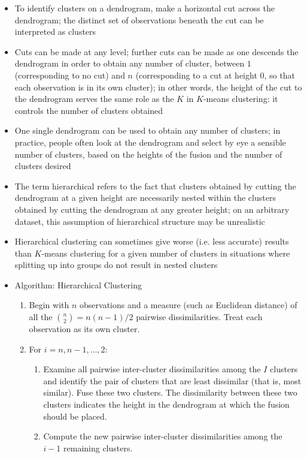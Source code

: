\documentclass[12pt]{article}
\begin{document}
\begin{itemize}
\item To identify clusters on a dendrogram, make a horizontal cut across the dendrogram; the distinct set of observations beneath the cut can be interpreted as clusters
\item Cuts can be made at any level; further cuts can be made as one descends the dendrogram in order to obtain any number of cluster, between $1$ (corresponding to no cut) and $n$ (corresponding to a cut at height $0$, so that each observation is in its own cluster); in other words, the height of the cut to the dendrogram serves the same role as the $K$ in $K$-means clustering: it controls the number of clusters obtained 
\item One single dendrogram can be used to obtain any number of clusters; in practice, people often look at the dendrogram and select by eye a sensible number of clusters, based on the heights of the fusion and the number of clusters desired 
\item The term hierarchical refers to the fact that clusters obtained by cutting the dendrogram at a given height are necessarily nested within the clusters obtained by cutting the dendrogram at any greater height; on an arbitrary dataset, this assumption of hierarchical structure may be unrealistic 
\item Hierarchical clustering can sometimes give worse (i.e. less accurate) results than $K$-means clustering for a given number of clusters in situations where splitting up into groups do not result in nested clusters 
\item Algorithm: Hierarchical Clustering \begin{enumerate} 
\item Begin with $n$ observations and a measure (such as Euclidean distance) of all the $\binom{n}{2} = n(n-1)/2$ pairwise dissimilarities. Treat each observation as its own cluster.
\item For $i=n,n-1,\dots,2$: \begin{enumerate} 
\item Examine all pairwise inter-cluster dissimilarities among the $I$ clusters and identify the pair of clusters that are least dissimilar (that is, most similar). Fuse these two clusters. The dissimilarity between these two clusters indicates the height in the dendrogram at which the fusion should be placed.
\item Compute the new pairwise inter-cluster dissimilarities among the $i-1$ remaining clusters. \end{enumerate} \end{enumerate} 

\end{itemize}
\end{document}
